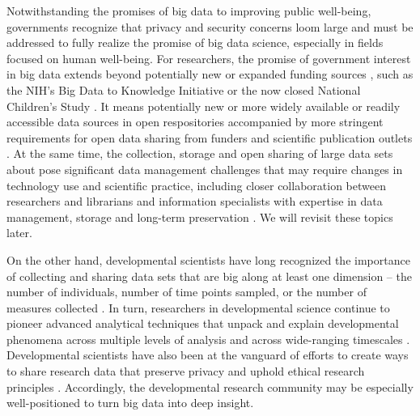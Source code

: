 Notwithstanding the promises of big data to improving public well-being, governments recognize that privacy and security concerns loom large \cite{Obama2014, Vinton2015} and must be addressed to fully realize the promise of big data science, especially in fields focused on human well-being.
For researchers, the promise of government interest in big data extends beyond potentially new or expanded funding sources \cite{NSFBigData}, such as the NIH's Big Data to Knowledge Initiative \cite{BD2K2015} or the now closed National Children's Study \cite{NCS2015}.
It means potentially new or more widely available or readily accessible data sources in open respositories \cite{databrary.org, dataverse.org, ICSPR, macwhinney_childes_2001} accompanied by more stringent requirements for open data sharing from funders \cite{NIMH2015, NSF2011, GatesFdn} and scientific publication outlets \cite{nosek_promoting_2015}.
At the same time, the collection, storage and open sharing of large data sets about pose significant data management challenges that may require changes in technology use \cite{ProjectJupyter, osf} and scientific practice, including closer collaboration between researchers and librarians and information specialists with expertise in data management, storage and long-term preservation \cite{gordon_researcher-library_2015, lynch_big_2008}.
We will revisit these topics later.

On the other hand, developmental scientists have long recognized the importance of collecting and sharing data sets that are big along at least one dimension -- the number of individuals, number of time points sampled, or the number of measures collected \cite{macwhinney_childes_2001}.
In turn, researchers in developmental science continue to pioneer advanced analytical techniques that unpack and explain developmental phenomena across multiple levels of analysis and across wide-ranging timescales \cite{bakeman_sequential_2011, CDS2014, QuantDev}.
Developmental scientists have also been at the vanguard of efforts to create ways to share research data that preserve privacy and uphold ethical research principles \cite{Adolph2012, AERA2011, AERAVideo2015, Asilomar2014, Databrary2015}.
Accordingly, the developmental research community may be especially well-positioned to turn big data into deep insight.